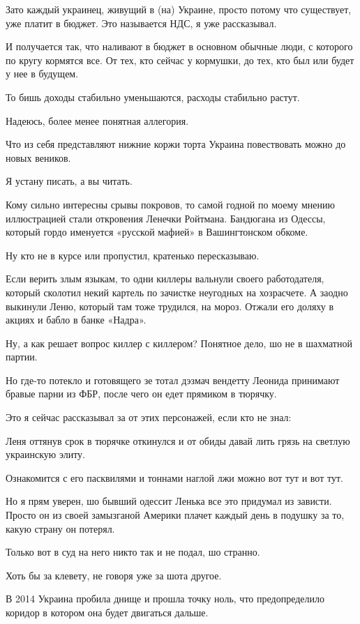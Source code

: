 \begin{multicols}{2}
Зато каждый украинец, живущий в (на) Украине, просто потому что существует, уже
платит в бюджет. Это называется НДС, я уже рассказывал.

И получается так, что наливают в бюджет в основном обычные люди, с которого по
кругу кормятся все. От тех, кто сейчас у кормушки, до тех, кто был или будет у
нее в будущем.

То бишь доходы стабильно уменьшаются, расходы стабильно растут.

Надеюсь, более менее понятная аллегория.

Что из себя представляют нижние коржи торта Украина повествовать можно до новых
веников.

Я устану писать, а вы читать.

Кому сильно интересны срывы покровов, то самой годной по моему мнению
иллюстрацией стали откровения Ленечки Ройтмана. Бандюгана из Одессы, который
гордо именуется «русской мафией» в Вашингтонском обкоме.

Ну кто не в курсе или пропустил, кратенько пересказываю.

Если верить злым языкам, то одни киллеры вальнули своего работодателя, который
сколотил некий картель по зачистке неугодных на хозрасчете. А заодно выкинули
Леню, который там тоже трудился, на мороз. Отжали его доляху в акциях и бабло в
банке «Надра».

Ну, а как решает вопрос киллер с киллером? Понятное дело, шо не в шахматной
партии.

Но где-то потекло и готовящего зе тотал дэзмач вендетту Леонида принимают
бравые парни из ФБР, после чего он едет прямиком в тюрячку.

Это я сейчас рассказывал за от этих персонажей, если кто не знал:


Леня оттянув срок в тюрячке откинулся и от обиды давай лить грязь на светлую
украинскую элиту.

Ознакомится с его пасквилями и тоннами наглой лжи можно вот тут и вот тут.

Но я прям уверен, шо бывший одессит Ленька все это придумал из зависти. Просто
он из своей замызганой Америки плачет каждый день в подушку за то, какую страну
он потерял.

Только вот в суд на него никто так и не подал, шо странно.

Хоть бы за клевету, не говоря уже за шота другое.

В 2014 Украина пробила днище и прошла точку ноль, что предопределило коридор в
котором она будет двигаться дальше.


\end{multicols}

